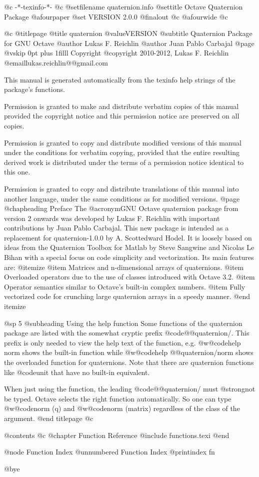    @c -*-texinfo-*-
@c %
@setfilename quaternion.info
@settitle Octave Quaternion Package
@afourpaper
@set VERSION 2.0.0
@finalout
@c @afourwide
@c %

@c %
@titlepage
@title quaternion @value{VERSION}
@subtitle Quaternion Package for GNU Octave
@author Lukas F. Reichlin
@author Juan Pablo Carbajal
@page
@vskip 0pt plus 1filll
Copyright @copyright{} 2010-2012, Lukas F. Reichlin @email{lukas.reichlin@@gmail.com}

This manual is generated automatically from the texinfo help strings
of the package's functions.

Permission is granted to make and distribute verbatim copies of
this manual provided the copyright notice and this permission notice
are preserved on all copies.

Permission is granted to copy and distribute modified versions of this
manual under the conditions for verbatim copying, provided that the entire
resulting derived work is distributed under the terms of a permission
notice identical to this one.

Permission is granted to copy and distribute translations of this manual
into another language, under the same conditions as for modified versions.
@page
@chapheading Preface
The @acronym{GNU} Octave quaternion package from version 2 onwards
was developed by Lukas F. Reichlin with important contributions by
Juan Pablo Carbajal.  This new package is intended as a replacement
for quaternion-1.0.0 by A. Scottedward Hodel.  It is loosely based
on ideas from the Quaternion Toolbox for Matlab by Steve Sangwine
and Nicolas Le Bihan with a special focus on code simplicity and
vectorization.  Its main features are:
@itemize
@item Matrices and n-dimensional arrays of quaternions.
@item Overloaded operators due to the use of classes introduced with Octave 3.2.
@item Operator semantics similar to Octave's built-in complex numbers.
@item Fully vectorized code for crunching large quaternion arrays in a speedy manner.
@end itemize


@sp 5
@subheading Using the help function
Some functions of the quaternion package are listed with the somewhat cryptic prefix
@code{@@quaternion/}.  This prefix is only needed to view the help text of the function,
e.g. @w{@code{help norm}} shows the built-in function while @w{@code{help @@quaternion/norm}}
shows the overloaded function for quaternions.  Note that there are quaternion functions
like @code{unit} that have no built-in equivalent.

When just using the function, the leading @code{@@quaternion/} must @strong{not} be typed.
Octave selects the right function automatically.  So one can type @w{@code{norm (q)}}
and @w{@code{norm (matrix)}} regardless of the class of the argument.
@end titlepage
@c %

@contents
@c @chapter Function Reference
@include functions.texi
@end

@node Function Index
@unnumbered Function Index
@printindex fn

@bye
